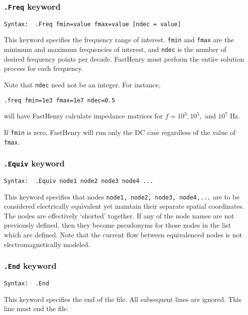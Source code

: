 \subsubsection{{\tt .Freq} keyword}

\begin{verbatim}
Syntax:  .Freq fmin=value fmax=value [ndec = value]
\end{verbatim}

This keyword specifies the frequency range of interest.  
{\tt fmin} and {\tt fmax} are the minimum and maximum
frequencies of interest, and {\tt ndec} is the number of desired frequency
points per decade.  FastHenry must perform the entire solution process
for each frequency.

Note that {\tt ndec} need not be an integer.  For instance, 
\begin{verbatim}
.freq fmin=1e3 fmax=1e7 ndec=0.5
\end{verbatim}
will have FastHenry calculate impedance matrices for $f = 10^3, 10^5, $
and $ 10^7$ Hz. 

If {\tt fmin} is zero, FastHenry will run only the DC case
regardless of the value of {\tt fmax}.  

\subsubsection{{\tt .Equiv} keyword}

\begin{verbatim}
Syntax:  .Equiv node1 node2 node3 node4 ...
\end{verbatim}

This keyword specifies that nodes {\tt node1, node2, node3, node4,...}
are to be considered electrically equivalent yet maintain their separate
spatial coordinates.  The nodes are effectively `shorted' together.  
If any of the node names are not previously defined, then they become
pseudonyms for those nodes in the list which are defined.
Note that the current flow between equivalenced nodes is not
electromagnetically modeled.

\subsubsection{{\tt .End} keyword}

\begin{verbatim}
Syntax:  .End
\end{verbatim}

This keyword specifies the end of the file.  All subsequent lines are
ignored.  This line must end the file.


